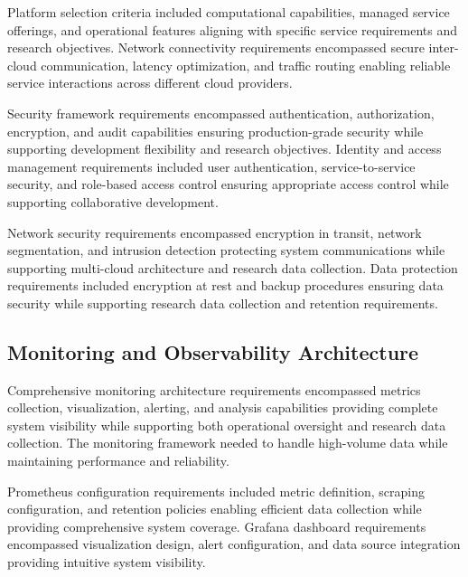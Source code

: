 Platform selection criteria included computational capabilities, managed service offerings, and operational features aligning with specific service requirements and research objectives. Network connectivity requirements encompassed secure inter-cloud communication, latency optimization, and traffic routing enabling reliable service interactions across different cloud providers.


Security framework requirements encompassed authentication, authorization, encryption, and audit capabilities ensuring production-grade security while supporting development flexibility and research objectives. Identity and access management requirements included user authentication, service-to-service security, and role-based access control ensuring appropriate access control while supporting collaborative development.

Network security requirements encompassed encryption in transit, network segmentation, and intrusion detection protecting system communications while supporting multi-cloud architecture and research data collection. Data protection requirements included encryption at rest and backup procedures ensuring data security while supporting research data collection and retention requirements.

\subsection{Monitoring and Observability Architecture}

Comprehensive monitoring architecture requirements encompassed metrics collection, visualization, alerting, and analysis capabilities providing complete system visibility while supporting both operational oversight and research data collection. The monitoring framework needed to handle high-volume data while maintaining performance and reliability.

Prometheus configuration requirements included metric definition, scraping configuration, and retention policies enabling efficient data collection while providing comprehensive system coverage. Grafana dashboard requirements encompassed visualization design, alert configuration, and data source integration providing intuitive system visibility.


